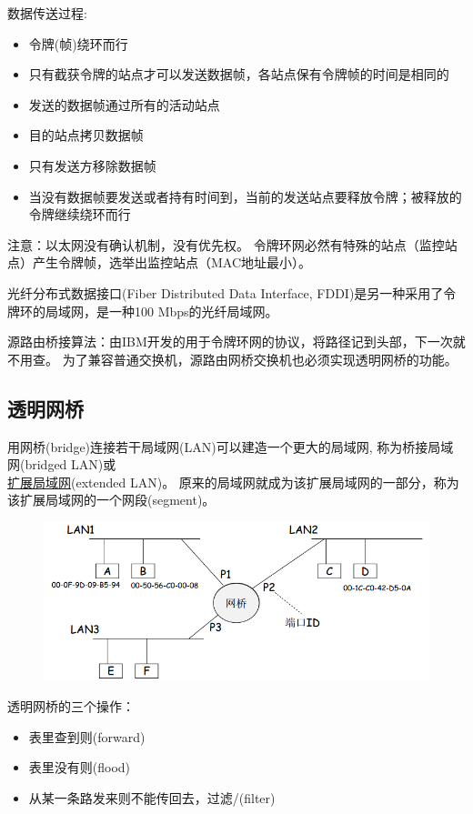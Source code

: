 数据传送过程:
\begin{itemize}
	\item 令牌(帧)绕环而行
	\item 只有截获令牌的站点才可以发送数据帧，各站点保有令牌帧的时间是相同的
	\item 发送的数据帧通过所有的活动站点
	\item 目的站点拷贝数据帧
	\item 只有发送方移除数据帧
	\item 当没有数据帧要发送或者持有时间到，当前的发送站点要释放令牌；被释放的令牌继续绕环而行
\end{itemize}

注意：以太网没有确认机制，没有优先权。
令牌环网必然有特殊的站点（监控站点）产生令牌帧，选举出监控站点（MAC地址最小）。

光纤分布式数据接口(Fiber Distributed Data Interface, FDDI)是另一种采用了令牌环的局域网，是一种100 Mbps的光纤局域网。

源路由桥接算法：由IBM开发的用于令牌环网的协议，将路径记到头部，下一次就不用查。
为了兼容普通交换机，源路由网桥交换机也必须实现透明网桥的功能。

\subsection{透明网桥}
用网桥(bridge)连接若干局域网(LAN)可以建造一个更大的局域网, 称为桥接局域网(bridged LAN)或\\\underline{扩展局域网}(extended LAN)。
原来的局域网就成为该扩展局域网的一部分，称为该扩展局域网的一个网段(segment)。
\begin{figure}[H]
	\centering
	\includegraphics[width=0.6\linewidth]{fig/extended-LAN.png}
\end{figure}

透明网桥的三个操作：
\begin{itemize}
	\item 表里查到则\underline{}(forward)
	\item 表里没有则\underline{}(flood)
	\item 从某一条路发来则不能传回去，过滤/\underline{}(filter)
\end{itemize}

